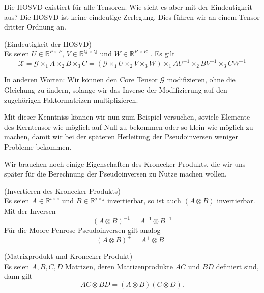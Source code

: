 Die HOSVD existiert für alle Tensoren. Wie sieht es aber mit der Eindeutigkeit aus? Die HOSVD ist keine eindeutige Zerlegung. Dies führen wir an einem Tensor dritter Ordnung an.

\begin{Beispiel} (Eindeutigkeit der HOSVD) \\
Es seien $U \in \mathbb{R}^{P \times P}$, $V \in \mathbb{R}^{Q \times Q}$  und $W \in \mathbb{R}^{R \times R}$ . Es gilt
\begin{equation}
{\pmb{\mathscr{X}}} = {\pmb{\mathscr{G}}} \times_1 A \times_2 B \times_3 C = ({\pmb{\mathscr{G}}} \times_1 U \times_2 V \times_3 W) \times_1 AU^{-1} \times_2 BV^{-1} \times_3 CW^{-1}
\end{equation}
\end{Beispiel}

In anderen Worten: Wir können den Core Tensor ${\pmb{\mathscr{G}}}$ modifizieren, ohne die Gleichung zu ändern, solange wir das Inverse der Modifizierung auf den zugehörigen Faktormatrizen multiplizieren.

Mit dieser Kenntniss können wir nun zum Beispiel versuchen, soviele Elemente des Kerntensor wie möglich auf Null zu bekommen oder so klein wie möglich zu machen, damit wir bei der späteren Herleitung der Pseudoinversen weniger Probleme bekommen. 

Wir brauchen noch einige Eigenschaften des Kronecker Produkts, die wir uns später für die Berechnung der Pseudoinversen zu Nutze machen wollen.

\begin{Lemma} (Invertieren des Kronecker Produkts) \\
Es seien $A \in \mathbb{R}^{i \times i}$ und $B \in \mathbb{R}^{j \times j}$ invertierbar, so ist auch $(A \otimes B)$ invertierbar. Mit der Inversen
\begin{equation*}
(A \otimes B)^{-1} = A^{-1} \otimes B^{-1}
\end{equation*}
Für die Moore Penrose Pseudoinversen gilt analog
\begin{equation*}
(A \otimes B)^{+} = A^{+} \otimes B^{+}
\end{equation*}
\end{Lemma}

\begin{Lemma} (Matrixprodukt und Kronecker Produkt) \label{lemma:prod} \\
Es seien $A,B,C,D$ Matrizen, deren Matrizenprodukte $AC$ und $BD$ definiert sind, dann gilt
\begin{equation*}
AC \otimes BD = (A \otimes B)(C \otimes D).
\end{equation*}
\end{Lemma}

